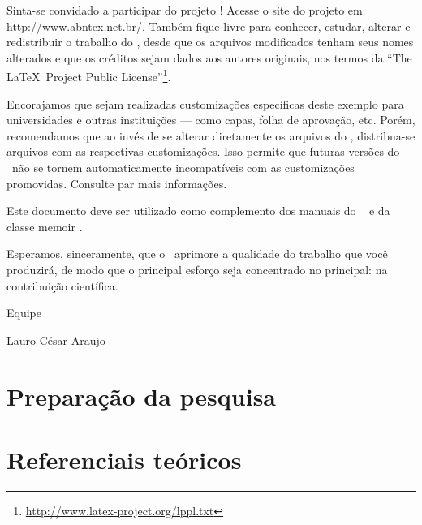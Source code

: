 \documentclass[
12pt,				%
openright,			%
twoside,			%
a4paper,			%
hyphens,
english,			%
french,				%
spanish,			%
brazil				%
]{abntex2}
\begin{document}
		Sinta-se convidado a participar do projeto \abnTeX! Acesse o site do projeto em
		\url{http://www.abntex.net.br/}. Também fique livre para conhecer,
		estudar, alterar e redistribuir o trabalho do \abnTeX, desde que os arquivos
		modificados tenham seus nomes alterados e que os créditos sejam dados aos
		autores originais, nos termos da ``The \LaTeX\ Project Public
		License''\footnote{\url{http://www.latex-project.org/lppl.txt}}.
		
		Encorajamos que sejam realizadas customizações específicas deste exemplo para
		universidades e outras instituições --- como capas, folha de aprovação, etc.
		Porém, recomendamos que ao invés de se alterar diretamente os arquivos do
		\abnTeX, distribua-se arquivos com as respectivas customizações.
		Isso permite que futuras versões do \abnTeX~não se tornem automaticamente
		incompatíveis com as customizações promovidas. Consulte
		 par mais informações.
		
		Este documento deve ser utilizado como complemento dos manuais do \abnTeX\ 
		\cite{abntex2classe,abntex2cite,abntex2cite-alf} e da classe \textsf{memoir}
		\cite{memoir}. 
		
		Esperamos, sinceramente, que o \abnTeX\ aprimore a qualidade do trabalho que
		você produzirá, de modo que o principal esforço seja concentrado no principal:
		na contribuição científica.
		
		Equipe \abnTeX 
		
		Lauro César Araujo
		
		\part{Preparação da pesquisa}
		
		
		
		\part{Referenciais teóricos}
		
\end{document}
